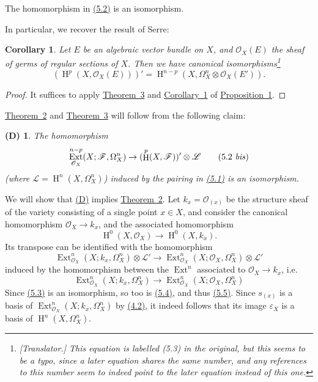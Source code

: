 \documentclass{article}
\theoremstyle{plain}
\newenvironment{theorem}[1]
  {\renewcommand\theinnertheorem{#1}\innertheorem}
  {\endinnertheorem}
\newtheorem*{corollary*}{Corollary}
\newtheorem*{denv}{(D)}
\theoremstyle{definition}
\newcommand{\scr}[1]{{\mathscr{#1}}}
\DeclareMathOperator{\Ext}{Ext}
\DeclareMathOperator{\HH}{H}
\newcommand{\oldpage}[1]{\marginpar{\footnotesize$\Big\vert$ \textit{p.~#1}}}
\begin{document}
\begin{theorem}{3}
\label{theorem3}
  The homomorphism in \hyperref[5.2]{(5.2)} is an isomorphism.
\end{theorem}

In particular, we recover the result of Serre:

\begin{corollary*}
\label{theorem3corollary}
  \renewcommand*{\thefootnote}{\fnsymbol{footnote}}
  Let $E$ be an algebraic vector bundle on $X$, and $\scr{O}_X(E)$ the sheaf of germs of regular sections of $X$.
  Then we have canonical isomorphisms\footnote{\emph{[Translator.] This equation is labelled (5.3) in the original, but this seems to be a typo, since a later equation shares the same number, and any references to this number seem to indeed point to the later equation instead of this one.}}
  \[
    (\HH^p(X,\scr{O}_X(E)))' = \HH^{n-p}(X,\Omega_X^n\otimes\scr{O}_X(E')).
  \]
\end{corollary*}

\begin{proof}
  It suffices to apply \hyperref[theorem3]{Theorem~3} and \hyperref[proposition1corollary1]{Corollary~1} of \hyperref[proposition1]{Proposition~1}.
\end{proof}

\hyperref[theorem2]{Theorem~2} and \hyperref[theorem3]{Theorem~3} will follow from the following claim:

\begin{denv}
\label{(D)}
  The homomorphism
  \[
  \label{5.2bis}
    \Ext_{\scr{O}_X}^{n-p}(X;\scr{F},\Omega_X^n) \to (\HH^p(X,\scr{F}))'\otimes\scr{L}
  \tag{5.2 \emph{bis}}
  \]
  (where $\scr{L}=\HH^n(X,\Omega_X^n)$) induced by the pairing in \hyperref[5.1]{(5.1)} is an isomorphism.
\end{denv}

We will show that \hyperref[(D)]{(D)} implies \hyperref[theorem2]{Theorem~2}.
Let $k_x=\scr{O}_{(x)}$ be the structure sheaf of the variety consisting of a single point $x\in X$, and consider the canonical homomorphism $\scr{O}_X\to k_x$, and the associated homomorphism
\[
\label{5.3}
  \HH^0(X,\scr{O}_X) \to \HH^0(X,k_x).
\tag{5.3}
\]
Its transpose can be identified with the homomorphism
\[
\label{5.4}
  \Ext_{\scr{O}_X}^n(X;k_x,\Omega_X^n)\otimes\scr{L}' \to \Ext_{\scr{O}_X}^n(X;\scr{O}_X,\Omega_X^n)\otimes\scr{L}'
\tag{5.4}
\]
induced by the homomorphism between the $\Ext^n$ associated to $\scr{O}_X\to k_x$, i.e.
\[
\label{5.5}
  \Ext_{\scr{O}_X}^n(X;k_x,\Omega_X^n) \to \Ext_{\scr{O}_X}^n(X;\scr{O}_X,\Omega_X^n)
\tag{5.5}
\]
\oldpage{149-15}
Since \hyperref[5.3]{(5.3)} is an isomorphism, so too is \hyperref[5.4]{(5.4)}, and thus \hyperref[5.5]{(5.5)}.
Since $s_{(x)}$ is a basis of $\Ext_{\scr{O}_X}^n(X;k_x,\Omega_X^n)$ by \hyperref[4.2]{(4.2)}, it indeed follows that its image $\varepsilon_X$ is a basis of $\HH^n(X,\Omega_X^n)$.
\end{document}

